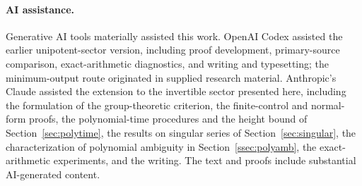\documentclass[acmlarge,screen,11pt,nonacm,natbib=false]{acmart}
\theoremstyle{definition}
\begin{document}
\paragraph{AI assistance.}
Generative AI tools materially assisted this work. OpenAI Codex assisted the earlier unipotent-sector version, including proof development, primary-source comparison, exact-arithmetic diagnostics, and writing and typesetting; the minimum-output route originated in supplied research material. Anthropic's Claude assisted the extension to the invertible sector presented here, including the formulation of the group-theoretic criterion, the finite-control and normal-form proofs, the polynomial-time procedures and the height bound of Section~\ref{sec:polytime}, the results on singular series of Section~\ref{sec:singular}, the characterization of polynomial ambiguity in Section~\ref{ssec:polyamb}, the exact-arithmetic experiments, and the writing. The text and proofs include substantial AI-generated content.

\providecommand{\bibfont}{}\renewcommand{\bibfont}{\normalfont\normalsize}


\end{document}
